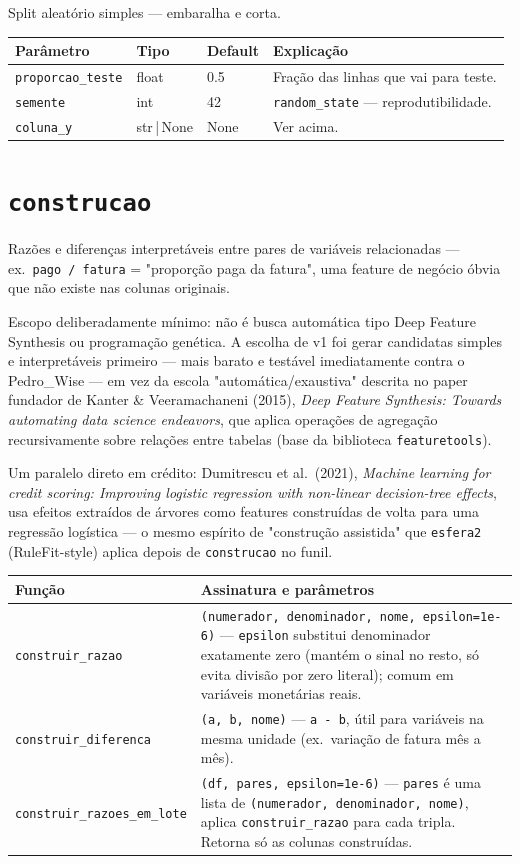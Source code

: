 \documentclass[11pt]{article}
\begin{document}
Split aleatório simples --- embaralha e corta.

\begin{longtable}{P{3.2cm}P{2cm}P{2cm}P{7.5cm}}
\toprule
\textbf{Parâmetro} & \textbf{Tipo} & \textbf{Default} & \textbf{Explicação} \\
\midrule
\endhead
\texttt{proporcao\_teste} & float & 0.5 & Fração das linhas que vai para teste. \\
\texttt{semente} & int & 42 & \texttt{random\_state} --- reprodutibilidade. \\
\texttt{coluna\_y} & str\,|\,None & None & Ver acima. \\
\bottomrule
\end{longtable}

\section{\texttt{construcao}}

Razões e diferenças interpretáveis entre pares de variáveis relacionadas ---
ex.\ \texttt{pago / fatura} = "proporção paga da fatura", uma feature de
negócio óbvia que não existe nas colunas originais.

Escopo deliberadamente mínimo: não é busca automática tipo Deep Feature
Synthesis ou programação genética. A escolha de v1 foi gerar candidatas
simples e interpretáveis primeiro --- mais barato e testável imediatamente
contra o Pedro\_Wise --- em vez da escola "automática/exaustiva" descrita no
paper fundador de Kanter \& Veeramachaneni (2015), \emph{Deep
Feature Synthesis: Towards automating data science endeavors}, que aplica
operações de agregação recursivamente sobre relações entre tabelas (base da
biblioteca \texttt{featuretools}).

Um paralelo direto em crédito: Dumitrescu et al.\ (2021), \emph{Machine
learning for credit scoring: Improving logistic regression with non-linear
decision-tree effects}, usa efeitos extraídos de árvores como features
construídas de volta para uma regressão logística --- o mesmo espírito de
"construção assistida" que \texttt{esfera2} (RuleFit-style) aplica depois de
\texttt{construcao} no funil.

\begin{longtable}{P{4cm}P{9.5cm}}
\toprule
\textbf{Função} & \textbf{Assinatura e parâmetros} \\
\midrule
\endhead
\texttt{construir\_razao} &
\texttt{(numerador, denominador, nome, epsilon=1e-6)} --- \texttt{epsilon}
substitui denominador exatamente zero (mantém o sinal no resto, só evita
divisão por zero literal); comum em variáveis monetárias reais. \\[0.4em]
\texttt{construir\_diferenca} &
\texttt{(a, b, nome)} --- \texttt{a - b}, útil para variáveis na mesma
unidade (ex.\ variação de fatura mês a mês). \\[0.4em]
\texttt{construir\_razoes\_em\_lote} &
\texttt{(df, pares, epsilon=1e-6)} --- \texttt{pares} é uma lista de
\texttt{(numerador, denominador, nome)}, aplica \texttt{construir\_razao}
para cada tripla. Retorna só as colunas construídas. \\
\bottomrule
\end{longtable}
\end{document}
